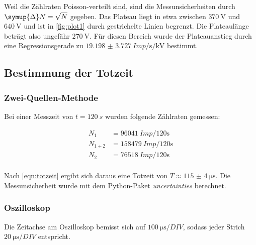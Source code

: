Weil die Zählraten Poisson-verteilt sind, sind die Messunsicherheiten durch $\symup{\Delta}N = \sqrt{N}$ gegeben.
Das Plateau liegt in etwa zwischen $\SI{370}{\volt}$ und $\SI{640}{\volt}$
und ist in \autoref{fig:plot1} durch gestrichelte Linien begrenzt.
Die Plateaulänge beträgt also ungefähr $\SI{270}{\volt}$.
Für diesen Bereich wurde
der Plateauanstieg durch
eine Regressionsgerade
zu $\SI{19.198(3727)}{{Imp}\per\second\per\kilo\volt}$
bestimmt.

\subsection{Bestimmung der Totzeit}

\subsubsection{Zwei-Quellen-Methode}
\label{sec:totzeit_zweiquellen}

Bei einer Messzeit von $t = \SI{120}{s}$ wurden folgende Zählraten gemessen:

\begin{align*}
N_{1}   &= \SI{96041} {{Imp} \per 120 \second} \\
N_{1+2} &= \SI{158479}{{Imp} \per 120 \second} \\
N_{2}   &= \SI{76518} {{Imp} \per 120 \second} \\
\end{align*}

Nach \autoref{eqn:totzeit} ergibt sich daraus eine Totzeit von $T \approx \SI{115(4)}{\micro\second}$.
Die Messunsicherheit
wurde mit dem Python-Paket \textit{uncertainties} berechnet.



\subsubsection{Oszilloskop}
\label{sec:totzeit_oszilloskop}

Die Zeitachse am Oszilloskop bemisst sich auf $\SI{100}{\micro\second \per {DIV}}$,
sodass jeder Strich $\SI{20}{\micro\second \per {DIV}}$ entspricht.

